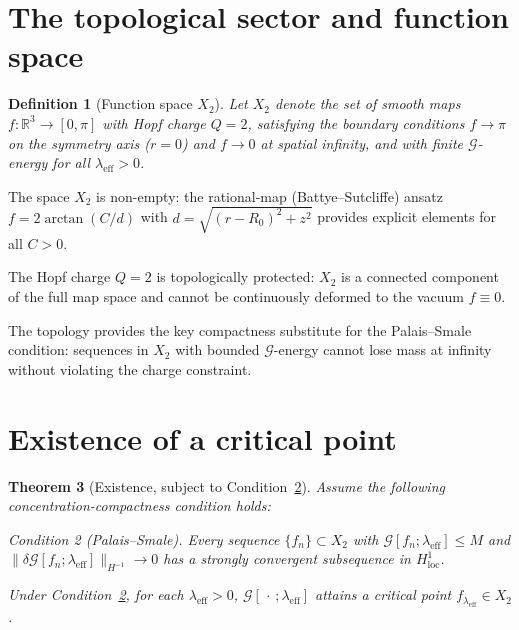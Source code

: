 \documentclass[11pt,a4paper]{article}
\newcommand{\leff}{\lambda_{\mathrm{eff}}}
\newcommand{\G}{\mathcal{G}}
\newtheorem{theorem}{Theorem}[section]
\newtheorem{definition}[theorem]{Definition}
\theoremstyle{remark}
\newtheorem{condition}[theorem]{Condition}
\begin{document}
\section{The topological sector and function space}
\label{P2:sec:setup}

\begin{definition}[Function space $X_2$]
Let $X_2$ denote the set of smooth maps $f\colon\mathbb{R}^3\to[0,\pi]$
with Hopf charge $Q=2$, satisfying the boundary conditions
$f\to\pi$ on the symmetry axis ($r=0$) and $f\to 0$ at spatial infinity,
and with finite $\G$-energy for all $\leff>0$.
\end{definition}

The space $X_2$ is non-empty: the rational-map (Battye--Sutcliffe)
ansatz $f = 2\arctan(C/d)$ with $d=\sqrt{(r-R_0)^2+z^2}$ provides
explicit elements for all $C>0$.

The Hopf charge $Q=2$ is topologically protected: $X_2$ is a connected
component of the full map space and cannot be continuously deformed to
the vacuum $f\equiv 0$.

The topology provides the key compactness substitute for the
Palais--Smale condition: sequences in $X_2$ with bounded $\G$-energy
cannot lose mass at infinity without violating the charge constraint.

\section{Existence of a critical point}
\label{P2:sec:existence}

\begin{theorem}[Existence, subject to Condition~\ref{P2:cond:ps}]
\label{P2:thm:existence}
Assume the following concentration-compactness condition holds:
\begin{condition}[Palais--Smale]
\label{P2:cond:ps}
Every sequence $\{f_n\}\subset X_2$ with $\G[f_n;\leff]\leq M$ and
$\|\delta\G[f_n;\leff]\|_{H^{-1}}\to 0$ has a strongly convergent
subsequence in $H^1_{\mathrm{loc}}$.
\end{condition}
Under Condition~\ref{P2:cond:ps}, for each $\leff>0$,
$\G[\,\cdot\,;\leff]$ attains a critical point $f_{\leff}\in X_2$.
\end{theorem}
\end{document}
